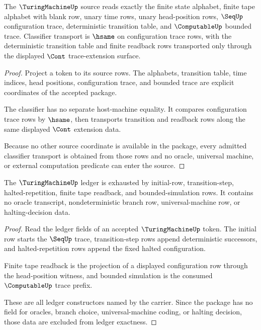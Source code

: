 \begin{theorem}
\label{thm:turingmachine-source-classifier-obligation}
The $\TuringMachineUp$ source reads exactly the finite state alphabet, finite
tape alphabet with blank row, unary time rows, unary head-position rows,
$\SeqUp$ configuration trace, deterministic transition table, and
$\ComputableUp$ bounded trace. Classifier transport is $\hsame$ on
configuration trace rows, with the deterministic transition table and finite
readback rows transported only through the displayed $\Cont$ trace-extension
surface.
\end{theorem}
\begin{proof}
Project a token to its source rows. The alphabets, transition table, time
indices, head positions, configuration trace, and bounded trace are explicit
coordinates of the accepted package.

The classifier has no separate host-machine equality. It compares configuration
trace rows by $\hsame$, then transports transition and readback rows along the
same displayed $\Cont$ extension data.

Because no other source coordinate is available in the package, every admitted
classifier transport is obtained from those rows and no oracle, universal
machine, or external computation predicate can enter the source.
\end{proof}

\begin{theorem}
\label{thm:turingmachine-ledger-exactness-obligation}
The $\TuringMachineUp$ ledger is exhausted by initial-row, transition-step,
halted-repetition, finite tape readback, and bounded-simulation rows. It
contains no oracle transcript, nondeterministic branch row, universal-machine
row, or halting-decision data.
\end{theorem}
\begin{proof}
Read the ledger fields of an accepted $\TuringMachineUp$ token. The initial row
starts the $\SeqUp$ trace, transition-step rows append deterministic successors,
and halted-repetition rows append the fixed halted configuration.

Finite tape readback is the projection of a displayed configuration row through
the head-position witness, and bounded simulation is the consumed
$\ComputableUp$ trace prefix.

These are all ledger constructors named by the carrier. Since the package has
no field for oracles, branch choice, universal-machine coding, or halting
decision, those data are excluded from ledger exactness.
\end{proof}

